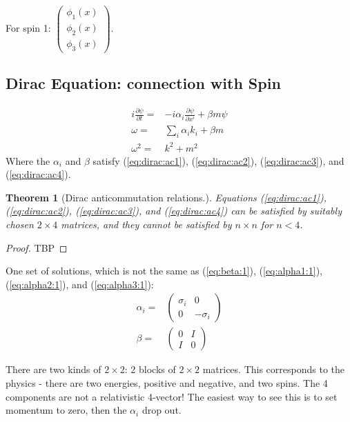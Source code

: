 \documentclass[]{article}
\newtheorem{thm}{Theorem}
\begin{document}
For spin 1: $\begin{pmatrix}
\phi_1(x)\\
\phi_2(x)\\
\phi_3(x)
\end{pmatrix}$.

\subsection{Dirac Equation: connection with Spin}

\begin{align*}
i \frac{\partial \psi}{\partial t} =& - i \alpha_i \frac{\partial \psi}{\partial x^i} + \beta m \psi\\
\omega =& \sum_i \alpha_i k_i + \beta m\\
\omega^2 =& k^2 + m^2
\end{align*}
Where the $\alpha_i$ and $\beta$ satisfy (\ref{eq:dirac:ac1}), (\ref{eq:dirac:ac2}), (\ref{eq:dirac:ac3}), and (\ref{eq:dirac:ac4}).


\begin{thm}[Dirac anticommutation relations.]\label{thm:dirac:anticommutation} 
	Equations (\ref{eq:dirac:ac1}), (\ref{eq:dirac:ac2}), (\ref{eq:dirac:ac3}), and (\ref{eq:dirac:ac4}) can be satisfied by suitably chosen $2\times4$ matrices, and they cannot be satisfied by $n \times n$ for $n<4$.
\end{thm}
\begin{proof}
	TBP
\end{proof}

One set of solutions, which is not the same as (\ref{eq:beta:1}), (\ref{eq:alpha1:1}), (\ref{eq:alpha2:1}), and (\ref{eq:alpha3:1}):
\begin{align*}
	\alpha_i=&\begin{pmatrix}
		\sigma_i&0\\
		0&-\sigma_i
	\end{pmatrix}\\
	\beta =& \begin{pmatrix}
		0&I\\
		I&0
	\end{pmatrix}
\end{align*}

There are two kinds of $2\times2$: 2 blocks of $2\times2$ matrices. This corresponds to the physics - there are two energies, positive and negative, and two spins.
The 4 components are not a relativistic 4-vector! The easiest way to see this is to set momentum to zero, then the $\alpha_i$ drop out.
\end{document}
